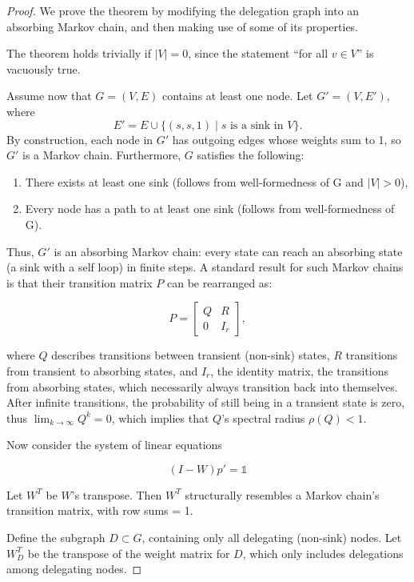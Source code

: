 \begin{proof}

We prove the theorem by modifying the delegation graph into an absorbing Markov chain, and then making use of some of its properties.

The theorem holds trivially if $|V| = 0$, since the statement “for all $v \in V$” is vacuously true.

Assume now that $G = (V, E)$ contains at least one node. Let $G' = (V, E')$, where
\[
E' = E \cup \{(s, s, 1) \mid s \text{ is a sink in } V\}.
\]
By construction, each node in $G'$ has outgoing edges whose weights sum to 1, so $G'$ is a Markov chain. Furthermore, $G$ satisfies the following:

\begin{enumerate}
\item There exists at least one sink (follows from well-formedness of G and $|V| > 0$),
\item Every node has a path to at least one sink (follows from well-formedness of G).
\end{enumerate}

Thus, $G'$ is an absorbing Markov chain: every state can reach an absorbing state (a sink with a self loop) in finite steps. A standard result for such Markov chains is that their transition matrix $P$ can be rearranged as:

\[
P = \begin{bmatrix}
Q & R \\
0 & I_r
\end{bmatrix},
\]

where $Q$ describes transitions between transient (non-sink) states, $R$ transitions from transient to absorbing states, and $I_r$, the identity matrix, the transitions from absorbing states, which necessarily always transition back into themselves. After infinite transitions, the probability of still being in a transient state is zero, thus $\lim_{k \to \infty} Q^k = 0$, which implies that $Q$'s spectral radius $\rho(Q) < 1$.

Now consider the system of linear equations

\[
(I - W)p' = \mathbb{1}
\]

Let $W^T$ be $W$'s transpose. Then $W^T$ structurally resembles a Markov chain's transition matrix, with row sums = 1.

Define the subgraph $D \subset G$, containing only all delegating (non-sink) nodes. Let $W_D^T$ be the transpose of the weight matrix for $D$, which only includes delegations among delegating nodes. 


\end{proof}
